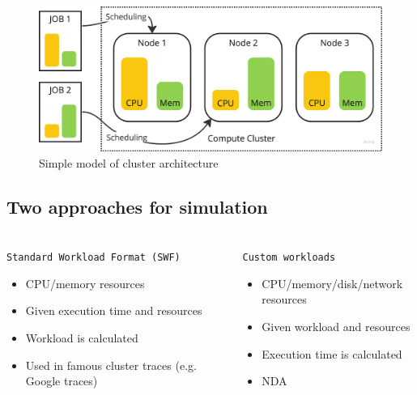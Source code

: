 \documentclass[t]{beamer}  %
\begin{document}
	\begin{frame}[fragile]
    \frametitle{\insertsection} 
	\framesubtitle{\insertsubsection}
	\vspace{0.1cm}	
	\begin{figure}[H]
		\centering
			\includegraphics[width=\linewidth]{images/cluster}
			\vspace{0.1cm}
			\caption*{Simple model of cluster architecture}
		\end{figure}


	\end{frame}

	\subsection{Two approaches for simulation}

    \begin{frame}[fragile]
    \frametitle{\insertsection} 
	\framesubtitle{\insertsubsection}
	
			\vspace{1cm}
	\begin{columns}[t]
		\begin{column}{0.55\textwidth}
			{\centering \small\texttt{Standard Workload Format (SWF)}}
			\vspace{0.3cm}
			\begin{itemize}
				\item<1-> CPU/memory resources
				\item<2-> Given execution time and resources
				\item<2-> Workload is calculated
				\item<3-> Used in famous cluster traces (e.g. Google traces)

			\end{itemize}
						
		\end{column}
		\begin{column}{0.5\textwidth}
			{\centering  \small\texttt{Custom workloads}}
			\vspace{0.3cm}
			\begin{itemize}
				\item<1-> CPU/memory/disk/network resources
				\item<2-> Given workload and resources
				\item<2-> Execution time is calculated
				\item<3-> NDA
			\end{itemize}
		\end{column}
	\end{columns}


    \end{frame}
\end{document}
